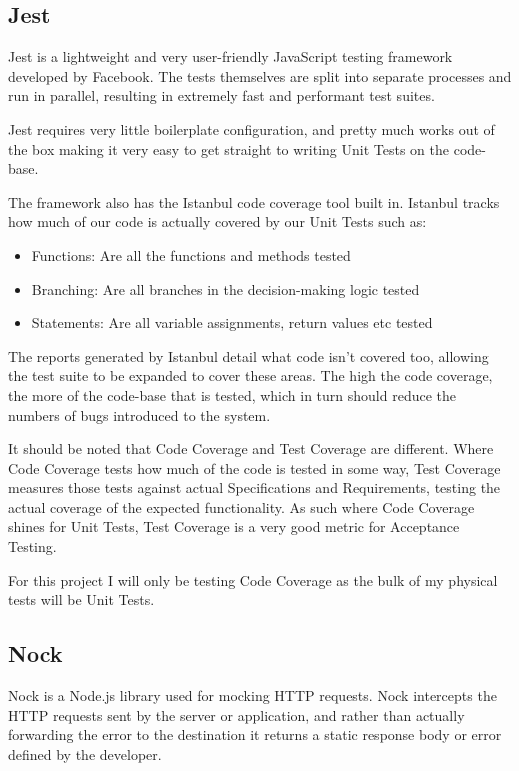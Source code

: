 \subsection{Jest}
Jest is a lightweight and very user-friendly JavaScript testing framework developed by Facebook. The tests themselves are split into separate processes and run in parallel, resulting in extremely fast and performant test suites.

Jest requires very little boilerplate configuration, and pretty much works out of the box making it very easy to get straight to writing Unit Tests on the code-base.

The framework also has the Istanbul code coverage tool built in. Istanbul tracks how much of our code is actually covered by our Unit Tests such as:
\begin{itemize}
    \item Functions: Are all the functions and methods tested
    \item Branching: Are all branches in the decision-making logic tested
    \item Statements: Are all variable assignments, return values etc tested
\end{itemize}

The reports generated by Istanbul detail what code isn't covered too, allowing the test suite to be expanded to cover these areas. The high the code coverage, the more of the code-base that is tested, which in turn should reduce the numbers of bugs introduced to the system.

It should be noted that Code Coverage and Test Coverage are different. Where Code Coverage tests how much of the code is tested in some way, Test Coverage measures those tests against actual Specifications and Requirements, testing the actual coverage of the expected functionality. As such where Code Coverage shines for Unit Tests, Test Coverage is a very good metric for Acceptance Testing.

For this project I will only be testing Code Coverage as the bulk of my physical tests will be Unit Tests.
\subsection{Nock}
Nock is a Node.js library used for mocking HTTP requests. Nock intercepts the HTTP requests sent by the server or application, and rather than actually forwarding the error to the destination it returns a static response body or error defined by the developer. 

